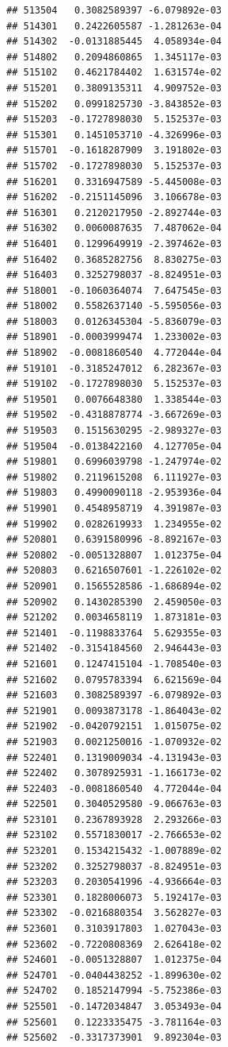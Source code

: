 \documentclass[ignorenonframetext,]{beamer}
\begin{document}
\begin{frame}[fragile]
\begin{verbatim}
## 513504   0.3082589397 -6.079892e-03
## 514301   0.2422605587 -1.281263e-04
## 514302  -0.0131885445  4.058934e-04
## 514802   0.2094860865  1.345117e-03
## 515102   0.4621784402  1.631574e-02
## 515201   0.3809135311  4.909752e-03
## 515202   0.0991825730 -3.843852e-03
## 515203  -0.1727898030  5.152537e-03
## 515301   0.1451053710 -4.326996e-03
## 515701  -0.1618287909  3.191802e-03
## 515702  -0.1727898030  5.152537e-03
## 516201   0.3316947589 -5.445008e-03
## 516202  -0.2151145096  3.106678e-03
## 516301   0.2120217950 -2.892744e-03
## 516302   0.0060087635  7.487062e-04
## 516401   0.1299649919 -2.397462e-03
## 516402   0.3685282756  8.830275e-03
## 516403   0.3252798037 -8.824951e-03
## 518001  -0.1060364074  7.647545e-03
## 518002   0.5582637140 -5.595056e-03
## 518003   0.0126345304 -5.836079e-03
## 518901  -0.0003999474  1.233002e-03
## 518902  -0.0081860540  4.772044e-04
## 519101  -0.3185247012  6.282367e-03
## 519102  -0.1727898030  5.152537e-03
## 519501   0.0076648380  1.338544e-03
## 519502  -0.4318878774 -3.667269e-03
## 519503   0.1515630295 -2.989327e-03
## 519504  -0.0138422160  4.127705e-04
## 519801   0.6996039798 -1.247974e-02
## 519802   0.2119615208  6.111927e-03
## 519803   0.4990090118 -2.953936e-04
## 519901   0.4548958719  4.391987e-03
## 519902   0.0282619933  1.234955e-02
## 520801   0.6391580996 -8.892167e-03
## 520802  -0.0051328807  1.012375e-04
## 520803   0.6216507601 -1.226102e-02
## 520901   0.1565528586 -1.686894e-02
## 520902   0.1430285390  2.459050e-03
## 521202   0.0034658119  1.873181e-03
## 521401  -0.1198833764  5.629355e-03
## 521402  -0.3154184560  2.946443e-03
## 521601   0.1247415104 -1.708540e-03
## 521602   0.0795783394  6.621569e-04
## 521603   0.3082589397 -6.079892e-03
## 521901   0.0093873178 -1.864043e-02
## 521902  -0.0420792151  1.015075e-02
## 521903   0.0021250016 -1.070932e-02
## 522401   0.1319009034 -4.131943e-03
## 522402   0.3078925931 -1.166173e-02
## 522403  -0.0081860540  4.772044e-04
## 522501   0.3040529580 -9.066763e-03
## 523101   0.2367893928  2.293266e-03
## 523102   0.5571830017 -2.766653e-02
## 523201   0.1534215432 -1.007889e-02
## 523202   0.3252798037 -8.824951e-03
## 523203   0.2030541996 -4.936664e-03
## 523301   0.1828006073  5.192417e-03
## 523302  -0.0216880354  3.562827e-03
## 523601   0.3103917803  1.027043e-03
## 523602  -0.7220808369  2.626418e-02
## 524601  -0.0051328807  1.012375e-04
## 524701  -0.0404438252 -1.899630e-02
## 524702   0.1852147994 -5.752386e-03
## 525501  -0.1472034847  3.053493e-04
## 525601   0.1223335475 -3.781164e-03
## 525602  -0.3317373901  9.892304e-03

\end{verbatim}
\end{frame}
\end{document}
